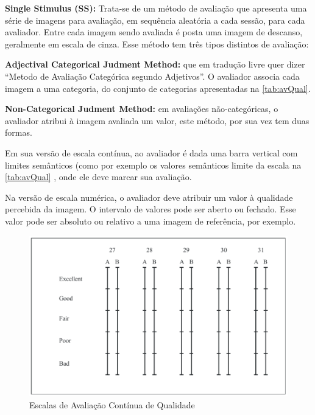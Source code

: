 \begin{description}
	\item{\textbf{Single Stimulus (SS):}} Trata-se de um método de avaliação que apresenta uma série de imagens para avaliação, em sequência aleatória a cada sessão, para cada avaliador. Entre cada imagem sendo avaliada é posta uma imagem de descanso, geralmente em escala de cinza. Esse método tem três tipos distintos de avaliação:
		\begin{description} 
			\item{\textbf{Adjectival Categorical Judment Method:}} que em tradução livre quer dizer ``Metodo de Avaliação Categórica segundo Adjetivos''. O avaliador associa cada imagem a uma categoria, do conjunto de categorias apresentadas na \autoref{tab:avQual}.
			\item{\textbf{Non-Categorical Judment Method:}} em avaliações não-categóricas, o avaliador atribui à imagem avaliada um valor, este método, por sua vez tem duas formas.

				Em sua versão de escala contínua, ao avaliador é dada uma barra vertical com limites semânticos (como por exemplo os valores semânticos limite da escala na \autoref{tab:avQual} , onde ele deve marcar sua avaliação.

				Na versão de escala numérica, o avaliador deve atribuir um valor à qualidade percebida da imagem. O intervalo de valores pode ser aberto ou fechado. Esse valor pode ser absoluto ou relativo a uma imagem de referência, por exemplo.
		\end{description}
\end{description}


\begin{figure}[htb]
	\centering
	\begin{minipage}{.8\textwidth}
		\centering
		\caption{Escalas de Avaliação Contínua de Qualidade}\label{fig:contScale}
		\includegraphics[width=.8\textwidth]{../img/ContinuousQualityScale.pdf}
	\end{minipage}
\end{figure}

